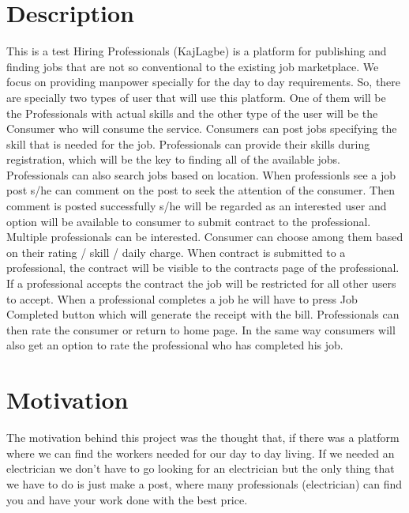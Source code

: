 
\section{Description}
This is a test
Hiring Professionals (KajLagbe) is a platform for publishing and finding jobs that are not so conventional to the existing job marketplace. We focus on providing manpower specially for the day to day requirements.
\newline 
\newline
So, there are specially two types of user that will use this platform. One of them will be the Professionals with actual skills and the other type of the user will be the Consumer who will consume the service.
\newline
\newline
Consumers can post jobs specifying the skill that is needed for the job.
Professionals can provide their skills during registration, which will be the key to finding all of the available jobs. Professionals can also search jobs based on location.
\newline
\newline
When professionls see a job post s/he can comment on the post to seek the attention of the consumer. Then comment is posted successfully s/he will be regarded as an interested user and option will be available to consumer to submit contract to the professional. Multiple professionals can be interested. Consumer can choose among them based on their rating / skill / daily charge.
\newline
\newline
When contract is submitted to a professional, the contract will be visible to the contracts page of the professional. If a professional accepts the contract the job will be restricted for all other users to accept.
\newline
\newline
When a professional completes a job he will have to press Job Completed button which will generate the receipt with the bill. Professionals can then rate the consumer or return to home page. In the same way consumers will also get an option to rate the professional who has completed his job. 

\clearpage

\section{Motivation}
The motivation behind this project was the thought that, if there was a platform where we can find the workers needed for our day to day living. If we needed an electrician we don't have to go looking for an electrician but the only thing that we have to do is just make a post, where many professionals (electrician) can find you and have your work done with the best price.
\clearpage

